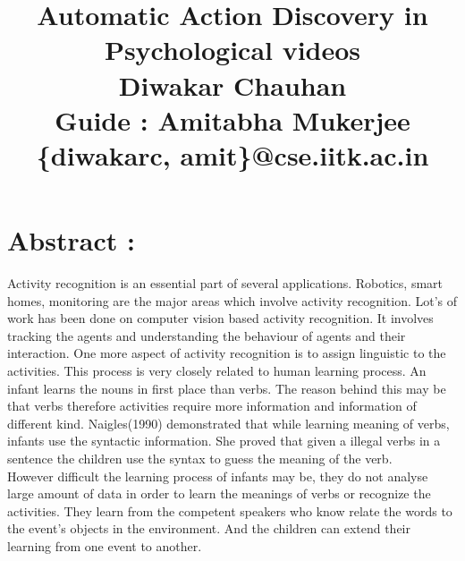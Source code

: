 \documentclass[10pt, twocolumn]{article}
\begin{document}
\title{{\bf Automatic Action Discovery in Psychological videos}\\ \vspace{10pt}
			 { \normalsize {Diwakar Chauhan \\ Guide : Amitabha Mukerjee \\ \{diwakarc, amit\}@cse.iitk.ac.in}}}
\maketitle

\section*{Abstract :}
Activity recognition is an essential part of several applications. Robotics, smart homes, monitoring are the major areas which involve activity recognition. Lot's of work has been done on computer vision based activity recognition. It involves tracking the agents and understanding the behaviour of agents and their interaction. One more aspect of activity recognition is to assign linguistic to the activities. This process is very closely  related to human learning process. An infant learns the nouns in first place than verbs. The reason behind this may be that verbs therefore activities require more information and information of different kind. Naigles(1990)\cite{naigles} demonstrated that while learning meaning of verbs, infants use the syntactic information. She proved that given a illegal verbs in a sentence the children use the syntax to guess the meaning of the verb. \\
\hspace*{10pt} However difficult the learning process of infants may be, they do not analyse large amount of data in order to learn the meanings of verbs or recognize the activities. They learn from the competent speakers who know relate the words to the event's objects in the environment.\cite{kerr-cohen-08_wubble-world-lang-acquisition} And the children can extend their learning from one event to another. 
\end{document}
